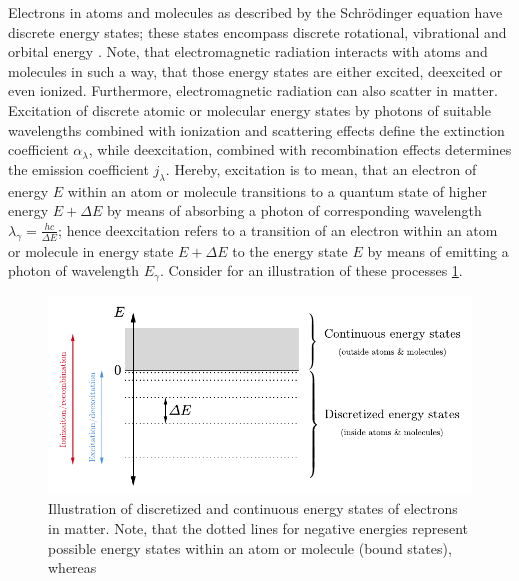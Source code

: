\documentclass[a4paper,11pt]{report}
\def\fc#1{{\color{black}{#1}}} %
\def\lk#1{{\color{black}{#1}}}
\begin{document}
Electrons in atoms and molecules as described by the Schrödinger equation have discrete energy states; these states encompass discrete rotational, vibrational and orbital energy \lk{levels}. Note, that electromagnetic radiation interacts with atoms and molecules in such a way, that those energy states are either excited, deexcited or even ionized. Furthermore, electromagnetic radiation can also scatter in matter. Excitation of discrete atomic or molecular energy states by photons of suitable wavelengths combined with ionization and scattering effects define the extinction coefficient $\alpha_\lambda$, while deexcitation, combined with recombination effects determines the emission coefficient $j_\lambda$. Hereby, excitation is to mean, that an electron of energy $E$ within an atom or molecule transitions to a quantum state of higher energy $E + \Delta E$ by means of absorbing a photon of corresponding wavelength $\lambda_{\gamma} = \tfrac{hc}{\Delta E}$; hence deexcitation refers to a transition of an electron within an atom or molecule in energy state $E + \Delta E$ to the energy state $E$ by means of emitting a photon of wavelength $E_\gamma$. Consider for an illustration of these processes \cref{fig:energylevels}.
\begin{figure}[h]
\centering
\includegraphics[width=12cm]{figures/energystates.pdf}
\caption{Illustration of discretized and continuous energy states of electrons in matter. Note, that the dotted lines for negative energies represent possible energy states within an atom or molecule (bound states), whereas \fc{the grey shaded area represents a continuum of possible energy states for free electrons.}}
\label{fig:energylevels}
\end{figure}
\end{document}
